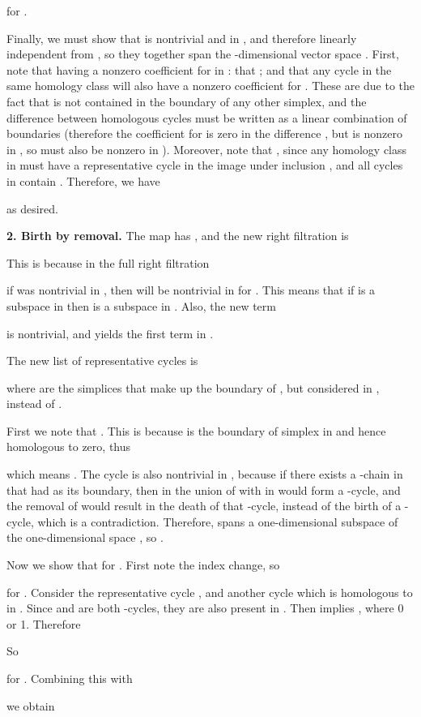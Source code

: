 \documentclass[12pt]{article}
\begin{document}
for .

Finally, we must show that  is nontrivial and in , and therefore linearly independent from , so they together span the -dimensional vector space . First, note that having a nonzero coefficient for  in : that ; and that any cycle  in the same homology class  will also have a nonzero coefficient for . These are due to the fact that  is not contained in the boundary of any other simplex, and the difference between homologous cycles must be written as a linear combination of boundaries (therefore the coefficient for  is zero in the difference , but is nonzero in , so must also be nonzero in ). Moreover, note that , since any homology class in  must have a representative cycle in the image under inclusion , and all cycles in  contain . Therefore, we have

as desired.

\textbf{2. Birth by removal.} The map  has , and the new right filtration is

This is because in the full right filtration

if  was nontrivial in , then  will be nontrivial in  for . This means that if  is a subspace in  then  is a subspace in . Also, the new term

is nontrivial, and yields the first term  in .

The new list of representative cycles is

where  are the simplices that make up the boundary of , but considered in , instead of .

First we note that . This is because  is the boundary of simplex  in  and hence homologous to zero, thus

which means . The cycle  is also nontrivial in , because if there exists a -chain  in  that had  as its boundary, then in  the union of  with  in  would form a -cycle, and the removal of  would result in the death of that -cycle, instead of the birth of a -cycle, which is a contradiction. Therefore,  spans a one-dimensional subspace of the one-dimensional space , so .

Now we show that  for . First note the index change, so

for . Consider the representative cycle , and another cycle  which is homologous to  in . Since  and  are both -cycles, they are also present in . Then  implies , where  0 or 1. Therefore

So

for . Combining this with

we obtain
\end{document}
